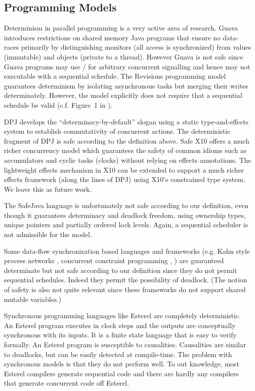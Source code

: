 \label{sec:related}

\subsection{Programming Models} 
Determinism in parallel programming is a very active area of research.
Guava \cite{guava} introduces restrictions on shared memory Java
programs that ensure no data-races primarily by distinguishing
monitors (all access is synchronized) from values (immutable) and
objects (private to a thread). However Guava is not safe since Guava
programs may use / for arbitrary concurrent
signalling and hence may not executable with a sequential
schedule. The Revisions programming model \cite{Revisions} guarantees
determinism by isolating asynchronous tasks but merging their writes
determinately. However, the model explicitly does not require that
a sequential schedule be valid (c.f. Figure~1 in \cite{Revisions}).


DPJ develops the ``determinacy-by-default'' slogan using a static
type-and-effects system to establish commutativity of concurrent
actions.  The deterministic fragment of DPJ is safe according to the
definition above. Safe X10 offers a much richer concurrency model
which guarantees the safety of common idioms such as accumulators and
cyclic tasks (clocks) without relying on effects annotations. The
lightweight effects mechanism in X10 can be extended to support a much
richer effects framework (along the lines of DPJ) using X10's
constrained type system.  We leave this as future work.

The SafeJava language \cite{SafeJava} is unfortunately not safe
according to our definition, even though it guarantees determinacy and
deadlock freedom, using ownership types, unique pointers and partially
ordered lock levels. Again, a sequential scheduler is not admissible
for the model.

Some data-flow synchronization based languages and frameworks (e.g.{}
Kahn style process networks \cite{kahn,kahn-mcqueen}, concurrent
constraint programming \cite{ccp}, \cite{SHIM}) are guaranteed
determinate but not safe according to our definition since they do not
permit sequential schedules. Indeed they permit the possibility of
deadlock. (The notion of safety is also not quite relevant since these
frameworks do not support shared mutable variables.)


Synchronous programming languages like Esterel are completely
deterministic. An Esterel program executes in clock steps and the
outputs are conceptually synchronous with its inputs.  It is a finite
state language that is easy to verify formally. An Esterel program is
susceptible to causalities. Causalities are similar to deadlocks, but
can be easily detected at compile-time.  The problem with synchronous
models is that they do not perform well. To out knowledge, most
Esterel compilers generate sequential code and there are hardly any
compilers that generate concurrent code off Esterel.

